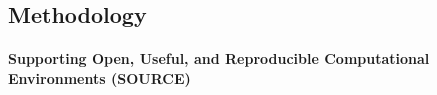 
\subsection{Methodology}\label{sec:concept_methodology}

%
%
%
%

\paragraph*{Supporting Open, Useful, and Reproducible Computational
  Environments (SOURCE)}\label{sec:SOURCE}

  \mbox{}\\

